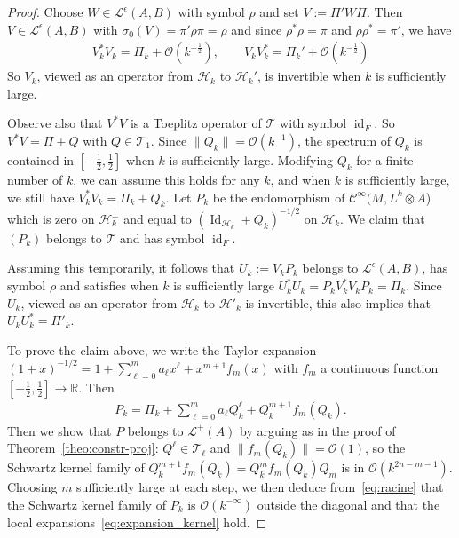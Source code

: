 \documentclass[10pt,a4paper]{article}
\theoremstyle{definition}
\numberwithin{equation}{section}
\newcommand{\R}{{\mathbb{R}}}
\newcommand{\si}{{\sigma}}
\newcommand{\ep}{\epsilon}
\newcommand{\op}{\operatorname}
\newcommand{\Ci}{{\mathcal{C}}^{\infty}}
\newcommand{\bigo}{\mathcal{O}}
\newcommand{\lag}{\mathcal{L}}
\newcommand{\Hilb}{\mathcal{H}}
\newcommand{\clT}{\mathcal{T}}
\begin{document}
\begin{proof}
Choose $W \in \lag^{\ep} (A,B)$ with symbol $\rho$ and set $V := \Pi' W \Pi$. Then $V
\in \lag^{\ep} (A,B)$ with $ \si_0(V) = \pi' \rho \pi = \rho$ and since $\rho^* \rho =
\pi$ and $\rho \rho^* = \pi'$, we have
\begin{gather}\label{eq:first_Step}
V^*_k V_k = \Pi_k + \bigo \left(k^{-\frac{1}{2}}\right), \qquad V_k V^*_k = \Pi_k' + \bigo \left(k^{-\frac{1}{2}}\right)
\end{gather}
So $V_k$, viewed as an operator from $\Hilb_k$ to $\Hilb_k'$, is invertible when $k$ is sufficiently large.

Observe also that $V^*V$ is a Toeplitz operator of $\clT$ with symbol $\op{id}_{F}$. So $V^*V = \Pi + Q$ with $Q \in
\clT_1$. Since $\| Q_k\| = \bigo (k^{-1})$, the spectrum of $Q_k$ is contained in $[-\frac{1}{2}, \frac{1}{2}]$ when $k$ is sufficiently large. Modifying $Q_k$ for a finite number of $k$, we can assume this holds for any $k$, and when $k$ is sufficiently large, we still have $V_k^*V_k = \Pi_k + Q_k$. Let $P_k$ be the endomorphism of $\Ci (M, L^k \otimes A$) which is zero on $\Hilb_k^{\perp}$ and equal to $(\op{Id}_{\Hilb_k} + Q_k) ^{-1/2}$ on $\Hilb_k$. We claim that $(P_k)$ belongs to $\clT$ and has symbol $\op{id}_{F}$.

Assuming this temporarily, it follows that $U_k := V_k P_k $ belongs to $\lag ^{\ep} (A,B)$, has symbol $\rho$ and satisfies when $k$ is sufficiently large $U_k^* U_k = P_k V_k^* V_k P_k = \Pi_k$. Since $U_k$, viewed as an operator from $\Hilb_k$ to $\Hilb'_k$ is invertible, this also implies that $U_kU_k^* = \Pi'_k$.

To prove the claim above, we write the Taylor expansion $(1+x)^{-1/2} = 1 +
\sum_{\ell = 0 }^m a_\ell x^\ell + x^{m+1} f_m (x)$ with $f_m$ a continuous function $[-\frac{1}{2},\frac{1}{2}] \rightarrow \R$. Then
\begin{gather}\label{eq:racine}
P_k = \Pi_k + \sum_{\ell = 0 }^m a_\ell Q_k^{\ell} + Q_k^{m+1} f_m (Q_k).
\end{gather}
Then we show that $P$ belongs to $\lag ^+ (A)$ by arguing as in the proof of Theorem~\ref{theo:constr-proj}: $Q^\ell \in \clT_\ell $ and $\| f_m (Q_k) \| = \bigo (1)$, so the Schwartz kernel family of $Q_k^{m+1} f_m (Q_k) = Q_k^m f_m (Q_k) Q_m$ is in $\bigo (k^{2n - m-1 })$. Choosing $m$ sufficiently large at each step, we then deduce from~\eqref{eq:racine} that the Schwartz kernel family of $P_k $ is $\bigo (k^{-\infty})$ outside the diagonal and that the local expansions~\eqref{eq:expansion_kernel} hold.


\end{proof}
\end{document}

